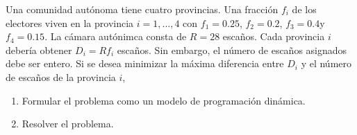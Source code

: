 \documentclass[twoside]{article}
\begin{document}
\newpage

\begin{ejercicio}{10}
Una comunidad autónoma tiene cuatro provincias. Una fracción $f_i$ de los electores viven en
la provincia $i = 1,\dots,4$ con $f_1 = 0.25$, $f_2 = 0.2$, $f_3 = 0.4 $y $f_4 = 0.15$. La cámara autónimca consta
de $R = 28$ escaños. Cada provincia $i$ debería obtener $D_i = Rf_i$ escaños. Sin embargo, el número
de escaños asignados debe ser entero. Si se desea minimizar la máxima diferencia entre $D_i$ y el
número de escaños de la provincia $i$,
\begin{enumerate}
\item Formular el problema como un modelo de programación dinámica.
\item Resolver el problema.
\end{enumerate}
\end{ejercicio}
\end{document}
